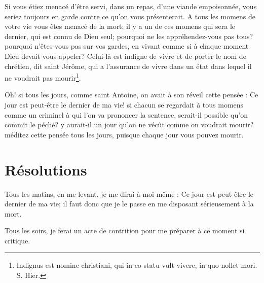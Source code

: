 \documentclass[instructions.tex]{subfiles}
\begin{document}
Si vous étiez menacé d'être servi, dans un repas, d'une viande empoisonnée, vous seriez toujours en garde contre ce qu'on vous présenterait. A tous les momens de votre vie vous êtes menacé de la mort; il y a un de ces momens qui sera le dernier, qui est connu de Dieu seul; pourquoi ne les appréhendez-vous pas tous? pourquoi n'êtes-vous pas sur vos gardes, en vivant comme si à chaque moment Dieu devait vous appeler? Celui-là est indigne de vivre et de porter le nom de chrétien, dit saint Jérôme, qui a l'assurance de vivre dans un état dans lequel il ne voudrait pas mourir\footnote{Indignus est nomine christiani, qui in eo statu vult vivere, in quo nollet mori. S. Hier.}.
 
Oh! si tous les jours, comme saint Antoine, on avait à son réveil cette pensée : Ce jour est peut-être le dernier de ma vie! si chacun se regardait à tous momens comme un criminel à qui l'on va prononcer la sentence, serait-il possible qu'on commît le péché? y aurait-il un jour qu'on ne vécût comme on voudrait mourir? méditez cette pensée tous les jours, puisque chaque jour vous pouvez mourir.
 
\section{Résolutions}
 
\primo Tous les matins, en me levant, je me dirai à moi-même : Ce jour est peut-être le dernier de ma vie; il faut donc que je le passe en me disposant sérieusement à la mort.
 
\secundo Tous les soirs, je ferai un acte de contrition pour me préparer à ce moment si critique. 

 
\end{document}
